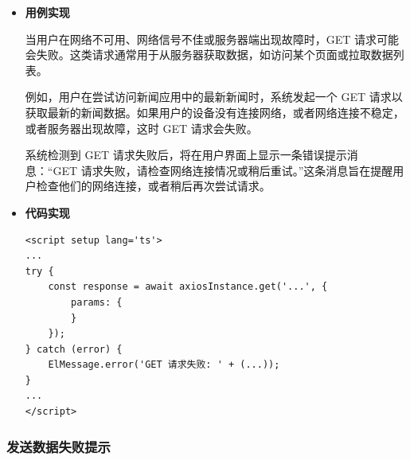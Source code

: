 \begin{itemize}
	\item \textbf{用例实现}
	
	当用户在网络不可用、网络信号不佳或服务器端出现故障时，GET 请求可能会失败。这类请求通常用于从服务器获取数据，如访问某个页面或拉取数据列表。
	
	例如，用户在尝试访问新闻应用中的最新新闻时，系统发起一个 GET 请求以获取最新的新闻数据。如果用户的设备没有连接网络，或者网络连接不稳定，或者服务器出现故障，这时 GET 请求会失败。
	
	系统检测到 GET 请求失败后，将在用户界面上显示一条错误提示消息：“GET 请求失败，请检查网络连接情况或稍后重试。”这条消息旨在提醒用户检查他们的网络连接，或者稍后再次尝试请求。
	
	\item \textbf{代码实现}
	
	\begin{verbatim}
<script setup lang='ts'>
...
try {
	const response = await axiosInstance.get('...', {
		params: {
		}
	});
} catch (error) {
	ElMessage.error('GET 请求失败: ' + (...));
}
...
</script>
	\end{verbatim}
\end{itemize}

\subsubsection{发送数据失败提示}

